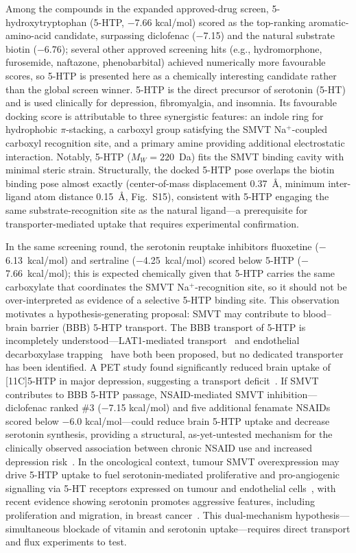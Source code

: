 \documentclass[10pt,letterpaper]{article}
\begin{document}
Among the compounds in the expanded approved-drug screen, 5-hydroxytryptophan (5-HTP, $-$7.66 kcal/mol) scored as the top-ranking aromatic-amino-acid candidate, surpassing diclofenac ($-$7.15) and the natural substrate biotin ($-$6.76); several other approved screening hits (e.g., hydromorphone, furosemide, naftazone, phenobarbital) achieved numerically more favourable scores, so 5-HTP is presented here as a chemically interesting candidate rather than the global screen winner. 5-HTP is the direct precursor of serotonin (5-HT) and is used clinically for depression, fibromyalgia, and insomnia. Its favourable docking score is attributable to three synergistic features: an indole ring for hydrophobic $\pi$-stacking, a carboxyl group satisfying the SMVT \mbox{Na$^+$}-coupled carboxyl recognition site, and a primary amine providing additional electrostatic interaction. Notably, 5-HTP ($M_W=220$~Da) fits the SMVT binding cavity with minimal steric strain. Structurally, the docked 5-HTP pose overlaps the biotin binding pose almost exactly (center-of-mass displacement 0.37~\AA{}, minimum inter-ligand atom distance 0.15~\AA{}, Fig.~S15), consistent with 5-HTP engaging the same substrate-recognition site as the natural ligand---a prerequisite for transporter-mediated uptake that requires experimental confirmation.

In the same screening round, the serotonin reuptake inhibitors fluoxetine ($-$6.13~kcal/mol) and sertraline ($-$4.25~kcal/mol) scored below 5-HTP ($-$7.66~kcal/mol); this is expected chemically given that 5-HTP carries the same carboxylate that coordinates the SMVT \mbox{Na$^+$}-recognition site, so it should not be over-interpreted as evidence of a selective 5-HTP binding site. This observation motivates a hypothesis-generating proposal: SMVT may contribute to blood--brain barrier (BBB) 5-HTP transport. The BBB transport of 5-HTP is incompletely understood---LAT1-mediated transport~\cite{kanai1998} and endothelial decarboxylase trapping~\cite{hardebo1979} have both been proposed, but no dedicated transporter has been identified. A PET study found significantly reduced brain uptake of [11C]5-HTP in major depression, suggesting a transport deficit~\cite{agren1991}. If SMVT contributes to BBB 5-HTP passage, NSAID-mediated SMVT inhibition---diclofenac ranked \#3 ($-$7.15 kcal/mol) and five additional fenamate NSAIDs scored below $-$6.0 kcal/mol---could reduce brain 5-HTP uptake and decrease serotonin synthesis, providing a structural, as-yet-untested mechanism for the clinically observed association between chronic NSAID use and increased depression risk~\cite{shaikh2023}. In the oncological context, tumour SMVT overexpression may drive 5-HTP uptake to fuel serotonin-mediated proliferative and pro-angiogenic signalling via 5-HT receptors expressed on tumour and endothelial cells~\cite{peters2014}, with recent evidence showing serotonin promotes aggressive features, including proliferation and migration, in breast cancer~\cite{paixao2026}. This dual-mechanism hypothesis---simultaneous blockade of vitamin and serotonin uptake---requires direct transport and flux experiments to test.
\end{document}
